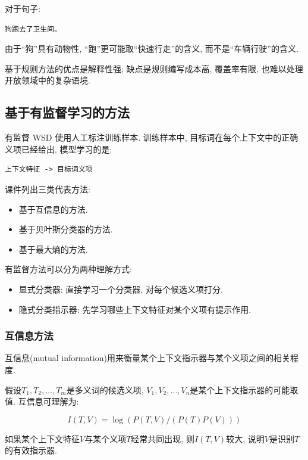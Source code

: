 对于句子:

\begin{Verbatim}[breaklines=true,breakanywhere=true,fontsize=\small]
狗跑去了卫生间。
\end{Verbatim}

由于“狗”具有动物性, “跑”更可能取“快速行走”的含义,
而不是“车辆行驶”的含义.

基于规则方法的优点是解释性强;
缺点是规则编写成本高, 覆盖率有限, 也难以处理开放领域中的复杂语境.

\subsection{基于有监督学习的方法}


有监督 WSD 使用人工标注训练样本.
训练样本中, 目标词在每个上下文中的正确义项已经给出.
模型学习的是:

\begin{Verbatim}[breaklines=true,breakanywhere=true,fontsize=\small]
上下文特征 -> 目标词义项
\end{Verbatim}

课件列出三类代表方法:

\begin{itemize}
\item 基于互信息的方法.
\item 基于贝叶斯分类器的方法.
\item 基于最大熵的方法.
\end{itemize}

有监督方法可以分为两种理解方式:

\begin{itemize}
\item 显式分类器: 直接学习一个分类器, 对每个候选义项打分.
\item 隐式分类指示器: 先学习哪些上下文特征对某个义项有提示作用.
\end{itemize}

\subsubsection{互信息方法}


互信息(mutual information)用来衡量某个上下文指示器与某个义项之间的相关程度.

假设$T_1, T_2, \dots, T_m$是多义词的候选义项,
$V_1, V_2, \dots, V_n$是某个上下文指示器的可能取值.
互信息可理解为:

\[
I(T, V) = \log(P(T, V) / (P(T) P(V)))
\]

如果某个上下文特征$V$与某个义项$T$经常共同出现,
则$I(T,V)$较大, 说明$V$是识别$T$的有效指示器.

